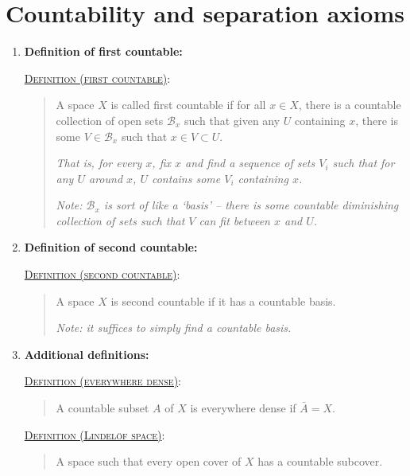 \documentclass[letterpaper, 12pt]{article}
\newcommand{\ms}[1]{\mathscr{#1}}
\newcommand{\defn}[2]{\textsc{\underline{Definition (#1)}:}\begin{quote} #2\end{quote}}
\begin{document}
\section{Countability and separation axioms}
    \begin{enumerate}[resume]
    \item \textbf{Definition of first countable:}

        \defn{first countable}{A space $X$ is called first countable if for all $x\in X$, there is a countable collection of open sets $\ms{B}_x$ such that given any $U$ containing $x$, there is some $V\in\ms{B}_x$ such that $x\in V\subset U$.

        \textit{That is, for every $x$, fix $x$ and find a sequence of sets $V_i$ such that for any $U$ around $x$, $U$ contains some $V_i$ containing $x$.}

        \textit{Note: $\ms{B}_x$ is sort of like a `basis' -- there is some countable diminishing collection of sets such that $V$ can fit between $x$ and $U$.}}
    \item \textbf{Definition of second countable:}

        \defn{second countable}{A space $X$ is second countable if it has a countable basis.

        \textit{Note: it suffices to simply find a countable basis.}}
    \item \textbf{Additional definitions:}

        \defn{everywhere dense}{A countable subset $A$ of $X$ is everywhere dense if $\bar{A} = X$.}

        \defn{Lindel\"of space}{A space such that every open cover of $X$ has a countable subcover.}


\end{enumerate}
\end{document}
